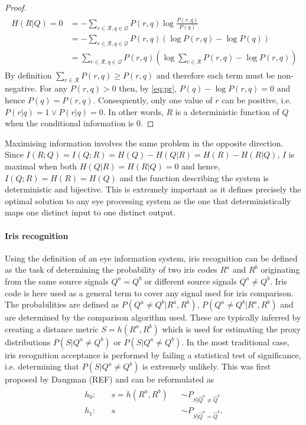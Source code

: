 \begin{proof}

\begin{align}\label{eq:pr}
\begin{aligned}
    H(R|Q) = 0 &=-\sum_{r\in\mathcal{R}, q\in\mathcal{Q}} P(r,q)\log\frac{P(r,q)}{P(q)}\\
    &= -\sum_{r\in\mathcal{R}, q\in\mathcal{Q}} P(r,q)\left(\log P(r,q) - \log P(q)\right)\\
    &= \sum_{r\in\mathcal{R}, q\in\mathcal{Q}} P(r, q)\left(\log \sum_{r\in\mathcal{R}} P(r, q) - \log P(r,q)\right)
\end{aligned}
\end{align}
By definition $\sum_{r\in\mathcal{R}} P(r, q) \geq P(r,q)$ and therefore each term must be non-negative. For any $P(r,q) > 0$ then, by \cref{eq:pr}, $P(q) - \log P(r,q) = 0$ and hence $P(q) = P(r,q)$. Consequently, only one value of $r$ can be positive, i.e. $P(r|q) = 1 \vee P(r|q) = 0$. In other words, $R$ is a deterministic function of $Q$ when the conditional information is $0$. 
\end{proof}

Maximising information involves the same problem in the opposite direction. Since $I(R;Q) = I(Q; R) = H(Q) - H(Q|R) = H(R) - H(R|Q)$, $I$ is maximal when both $H(Q|R)=H(R|Q)=0$ and hence, $I(Q;R)=H(R)=H(Q)$ and the function describing the system is deterministic and bijective. This is extremely important as it defines precisely the optimal solution to any eye processing system as the one that deterministically maps one distinct input to one distinct output.

\paragraph{Iris recognition}
Using the definition of an eye information system, iris recognition can be defined as the task of determining the probability of two iris codes $R^a$ and $R^b$ originating from the same source signals $Q^a = Q^b$ or different source signals $Q^a\neq Q^b$. Iris code is here used as a general term to cover any signal used for iris comparison. The probabilities are defined as $P(Q^a\neq Q^b|R^a, R^b)$, $P(Q^a\neq Q^b|R^a, R^b)$ and are determined by the comparison algorithm used. These are typically inferred by creating a distance metric $S = h(R^a, R^b)$ which is used for estimating the proxy distributions $P(S|Q^a\neq Q^b)$ or $P(S|Q^a\neq Q^b)$. In the most traditional case, iris recognition acceptance is performed by failing a statistical test of significance, i.e. determining that $P(S|Q^a\neq Q^b)$ is extremely unlikely. This was first proposed by Daugman (REF) and can be reformulated as
\begin{align}
\begin{aligned}
    h_0: & \quad s = h(R^a, R^b) &&\sim  P_{S|\hat{Q}^a\neq \hat{Q}^b}\\
    h_1: & \quad s && \sim  P_{S|\hat{Q}^a = \hat{Q}^b}.
\end{aligned}
\end{align}

